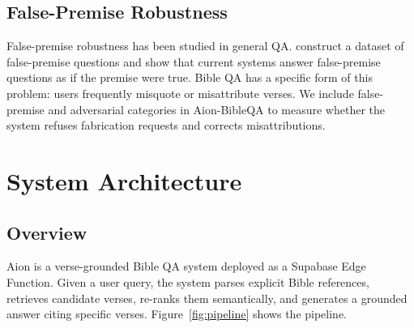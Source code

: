 \documentclass[11pt]{article}
\begin{document}
\subsection{False-Premise Robustness}

False-premise robustness has been studied in general QA.
\citet{hu2023falsepremise} construct a dataset of false-premise questions and show that current systems answer false-premise questions as if the premise were true.
Bible QA has a specific form of this problem: users frequently misquote or misattribute verses.
We include false-premise and adversarial categories in Aion-BibleQA to measure whether the system refuses fabrication requests and corrects misattributions.

\section{System Architecture}

\subsection{Overview}

Aion is a verse-grounded Bible QA system deployed as a Supabase Edge Function.
Given a user query, the system parses explicit Bible references, retrieves candidate verses, re-ranks them semantically, and generates a grounded answer citing specific verses.
Figure~\ref{fig:pipeline} shows the pipeline.
\end{document}

